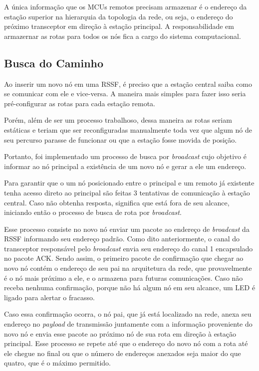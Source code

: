 {A única informação que os MCUs remotos precisam armazenar é o endereço da estação superior na hierarquia da
topologia da rede, ou seja, o endereço do próximo transceptor em direção à estação principal. A
responsabilidade em armazernar as rotas para todos os nós fica a cargo do sistema computacional.

\subsection{Busca do Caminho}
Ao inserir um novo nó em uma RSSF, é preciso que a estação central saiba como se comunicar com ele e
vice-versa. A maneira mais simples para fazer isso seria pré-configurar as rotas para cada estação remota.

Porém, além de ser um processo trabalhoso, dessa maneira as rotas seriam estáticas e teriam que ser
reconfiguradas manualmente toda vez que algum nó de seu percurso parasse de funcionar ou que a estação fosse movida de posição.

Portanto, foi implementado um processo de busca por \textit{broadcast} cujo objetivo é informar ao nó
principal a existência de um novo nó e gerar a ele um endereço.

Para garantir que o um nó posicionado entre o principal e um remoto já existente tenha acesso direto ao
principal são feitas 3 tentativas de comunicação à estação central. Caso não obtenha resposta, significa que
está fora de seu alcance, iniciando então o processo de busca de rota por \textit{broadcast}.

Esse processo consiste no novo nó enviar um pacote ao endereço de \textit{broadcast} da RSSF informando seu
endereço padrão. Como dito anteriormente, o canal do transceptor responsável pelo \textit{broadcast} envia seu
endereço do canal 1 encapsulado no pacote ACK. Sendo assim, o primeiro pacote de confirmação que chegar ao
novo nó contém o endereço de seu pai na arquitetura da rede, que provavelmente é o nó mais próximo a ele, e o
armazena para futuras comunicações. Caso não receba nenhuma confirmação, porque não há algum nó em seu
alcance, um LED é ligado para alertar o fracasso.

Caso essa confirmação ocorra, o nó pai, que já está localizado na rede, anexa seu endereço no \textit{payload}
de transmissão juntamente com a informação proveniente do novo nó e envia esse pacote ao próximo nó de sua
rota em direção à estação principal. Esse processo se repete até que o endereço do novo nó com a rota até ele
chegue no final ou que o número de endereços anexados seja maior do que quatro, que é o máximo permitido.

}
